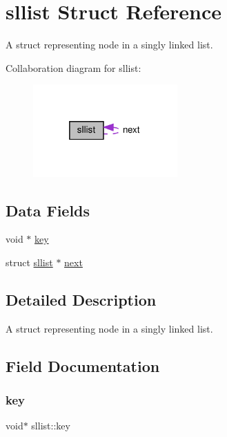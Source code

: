 \hypertarget{structsllist}{}\section{sllist Struct Reference}
\label{structsllist}


A struct representing node in a singly linked list.  




Collaboration diagram for sllist\+:\nopagebreak
\begin{figure}[H]
\begin{center}
\leavevmode
\includegraphics[width=157pt]{structsllist__coll__graph}
\end{center}
\end{figure}
\subsection*{Data Fields}
\begin{DoxyCompactItemize}
\item 
void $\ast$ \hyperlink{structsllist_aba6ff88336afdd0d2a8cb0ce396f79b6}{key}
\item 
struct \hyperlink{structsllist}{sllist} $\ast$ \hyperlink{structsllist_abd84069b1b074a7ac7d94b65672d4fd3}{next}
\end{DoxyCompactItemize}


\subsection{Detailed Description}
A struct representing node in a singly linked list. 

\subsection{Field Documentation}
\mbox{\label{structsllist_aba6ff88336afdd0d2a8cb0ce396f79b6}} 
\subsubsection{\texorpdfstring{key}{key}}
{\footnotesize\ttfamily void$\ast$ sllist\+::key}

